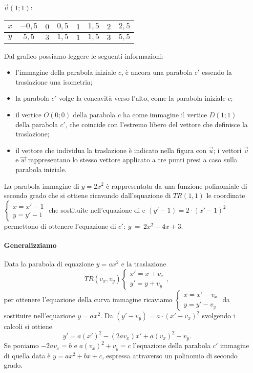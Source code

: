 $\vec u(1;1)$:\quad
\begin{tabular} {*{8}{c}}
$x$ & $-0,5$ & $0$ & $0,5$ & $1$ & $1,5$ & $2$ & $2,5$\\
\midrule
$y$ & $5,5$ & $3$ & $1,5$ & $1$ & $1,5$ & $3$ & $5,5$\\
\end{tabular}
\begin{center}
 
\end{center}
Dal grafico possiamo leggere le seguenti informazioni:
\begin{itemize}
\item l’immagine della parabola iniziale $ c $, è ancora una parabola $ c' $ essendo la traslazione una isometria;
\item la parabola $ c' $ volge la concavità verso l’alto, come la parabola iniziale $ c $;
\item il vertice $O(0;0)$ della parabola $ c $ ha come immagine il vertice $D(1;1)$ della parabola $ c' $, che coincide con l’estremo libero del vettore che definisce la traslazione;
\item il vettore che individua la traslazione è indicato nella figura con $\vec u$; i vettori $\vec v$ e $\vec w$ rappresentano lo stesso vettore applicato a tre punti presi a caso sulla parabola iniziale.
\end{itemize}
La parabola immagine di $y=2x^2$ è rappresentata da una funzione polinomiale di secondo grado che si ottiene ricavando dall’equazione di ${TR}(1,1)$ le coordinate $\left\{\begin{array}{l}{x=x'-1}\\{y=y'-1}\end{array}\right.$ che sostituite nell’equazione di c $(y'-1)=2\cdot (x'-1)^2$ permettono di ottenere l’equazione di $ c':~y~=~2x^2-4x+3$.
\paragraph{Generalizziamo}
Data la parabola di equazione $y=ax^2$ e la traslazione \[{TR}(v_x,v_y)\left\{\begin{array}{l}{x'=x+v_x}\\{y'=y+v_y}\end{array}\right.,\] per ottenere l’equazione della curva immagine ricaviamo $\left\{\begin{array}{l}{x=x'-v_x}\\{y=y'-v_y}\end{array}\right.$ da sostituire nell’equazione $y={ax}^2$. Da $(y'-v_y)=a\cdot (x'-v_x)^2$ svolgendo i calcoli si ottiene \[y'=a(x')^2-(2av_x)x'+a(v_x)^2+v_y.\] Se poniamo $-2{av}_x=b$ e $a(v_x)^2+v_y=c$ l’equazione della parabola $c'$ immagine di quella data è $y={ax}^2+{bx}+c$, espressa attraverso un polinomio di secondo grado.
